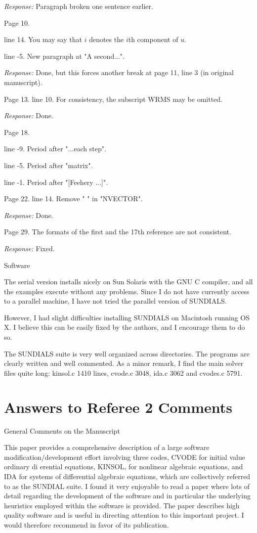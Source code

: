 \documentclass[12pt]{letter}
\begin{document}
{\em Response:} Paragraph broken one sentence earlier.
 
Page 10.

line 14. You may say that $i$ denotes the $i$th component of $u$.  

line -5. New paragraph at "A second...".  

{\em Response:} Done, but this forces another break at page 11, line 3
(in original manuscript).

Page 13.  
line 10. For consistency, the subscript WRMS may be omitted. 

{\em Response:} Done.
 
Page 18.

line -9. Period after "...each step".  

line -5. Period after "matrix".  

line -1. Period after "[Feehery ...]". 
 
Page 22.  
line 14. Remove " " in "NVECTOR". 

{\em Response:} Done.
 
Page 29. The formats of the first and the 17th reference are not consistent. 

{\em Response:} Fixed.

Software 

The serial version installs nicely on Sun Solaris with the GNU C
compiler, and all the examples execute without any problems. Since I
do not have currently access to a parallel machine, I have not tried
the parallel version of SUNDIALS.

However, I had slight difficulties installing SUNDIALS on Macintosh
running OS X. I believe this can be easily fixed by the authors, and I
encourage them to do so.

The SUNDIALS suite is very well organized across directories. The
programs are clearly written and well commented.  As a minor remark, I
find the main solver files quite long: kinsol.c 1410 lines, cvode.c
3048, ida.c 3062 and cvodes.c 5791.


\newpage
\section{Answers to Referee 2 Comments}

General Comments on the Manuscript 

This paper provides a comprehensive description of a large software
modification/development effort involving three codes, CVODE for
initial value ordinary di erential equations, KINSOL, for nonlinear
algebraic equations, and IDA for systems of differential algebraic
equations, which are collectively referred to as the SUNDIAL suite. I
found it very enjoyable to read a paper where lots of detail regarding
the development of the software and in particular the underlying
heuristics employed within the software is provided. The paper
describes high quality software and is useful in directing attention
to this important project.  I would therefore recommend in favor of
its publication.
\end{document}
